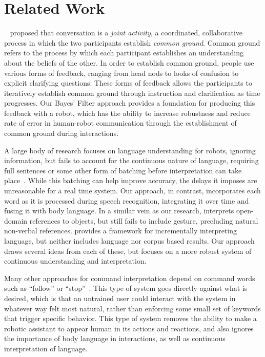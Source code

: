 \documentclass[a4paper, 11pt]{article} %
\begin{document}
\section{Related Work}
~\citet{clark96} proposed that conversation is a \textit{joint activity}, a coordinated, collaborative process in which the two participants establish \textit{common ground}. Common ground refers to the process by which each participant establishes an understanding about the beliefs of the other. In order to establish common ground, people use various forms of feedback, ranging from head nods to looks of confusion to explicit clarifying questions. These forms of feedback allows the participants to iteratively establish common ground through instruction and clarification as time progresses. Our Bayes' Filter approach provides a foundation for producing this feedback with a robot, which has the ability to increase robustness and reduce rate of error in human-robot communication through the establishment of common ground during interactions.

A large body of research focuses on language understanding for robots, ignoring information, but fails to account for the continuous nature of language, requiring full sentences or some other form of batching before interpretation can take place~\citep{macmahon06, dzifcak09, kollar10, matuszek12}. While this batching can help improve accuracy, the delays it imposes are unreasonable for a real time system. Our approach, in contrast, incorporates each word as it is processed during speech recognition, integrating it over time and fusing it with body language. In a similar vein as our research, \citet{guadarrama14} interprets open-domain references to objects, but still fails to include gesture, precluding natural non-verbal references. \citet{cantrell10} provides a framework for incrementally interpreting language, but neither includes language nor corpus based results. Our approach draws several ideas from each of these, but focuses on a more robust system of continuous understanding and interpretation.

Many other approaches for command interpretation depend on command words such as ``follow'' or ``stop''~\citep{waldherr00, marge11}. This type of system goes directly against what is desired, which is that an untrained user could interact with the system in whatever way felt most natural, rather than enforcing some small set of keywords that trigger specific behavior. This type of system removes the ability to make a robotic assistant to appear human in its actions and reactions, and also ignores the importance of body language in interactions, as well as continuous interpretation of language.
\end{document}
